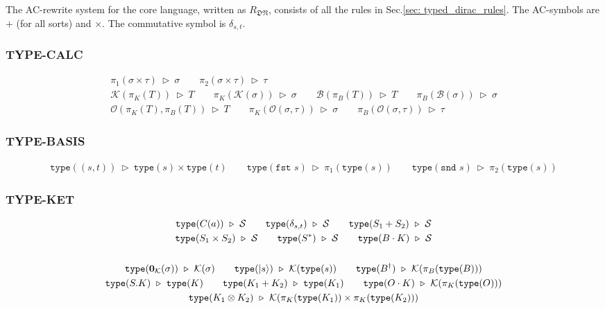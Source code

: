 \documentclass[manuscript, review, timestamp]{acmart}
\newcommand*{\Sc}{\mathcal{S}}
\newcommand*{\K}{\mathcal{K}}
\newcommand*{\B}{\mathcal{B}}
\newcommand*{\Op}{\mathcal{O}}
\newcommand*{\type}{\texttt{type}}
\newcommand*{\fst}{\texttt{fst }}
\newcommand*{\snd}{\texttt{snd }}
\newcommand*{\reduce}{\ \triangleright\ }
\begin{document}
\begin{definition} 
  The AC-rewrite system for the core language, written as $R_\mathfrak{DN}$, consists of all the rules in Sec.\ref{sec: typed_dirac_rules}.
  The AC-symbols are $+$ (for all sorts) and $\times$. The commutative symbol is $\delta_{s, t}$.
\end{definition}

\subsubsection*{\textsf{TYPE-CALC}}
\begin{gather*}
  \pi_1(\sigma \times \tau) \reduce \sigma 
  \qquad
  \pi_2(\sigma \times \tau) \reduce \tau 
  \\
  \K(\pi_K(T)) \reduce T
  \qquad 
  \pi_K(\K(\sigma)) \reduce \sigma
  \qquad
  \B(\pi_B(T)) \reduce T
  \qquad 
  \pi_B(\B(\sigma)) \reduce \sigma
  \\
  \Op(\pi_K(T), \pi_B(T)) \reduce T
  \qquad
  \pi_K(\Op(\sigma, \tau)) \reduce \sigma
  \qquad
  \pi_B(\Op(\sigma, \tau)) \reduce \tau
\end{gather*}

\subsubsection*{\textsf{TYPE-BASIS}}
\begin{gather*}
  \type((s, t)) \reduce \type(s) \times \type(t)
  \qquad
  \type(\fst s) \reduce \pi_1 (\type(s))
  \qquad
  \type(\snd s) \reduce \pi_2 (\type(s))
\end{gather*}

\subsubsection*{\textsf{TYPE-KET}}
\begin{gather*}
  \type(C(a)) \reduce \Sc
  \qquad
  \type(\delta_{s, t}) \reduce \Sc
  \qquad
  \type(S_1 + S_2) \reduce \Sc
  \\
  \type(S_1 \times S_2) \reduce \Sc
  \qquad
  \type(S^*) \reduce \Sc
  \qquad
  \type(B \cdot K) \reduce \Sc \\
  \\
  \type(\mathbf{0}_\mathcal{K}(\sigma)) \reduce \K(\sigma)
  \qquad
  \type(\ket{s}) \reduce \K(\type(s))
  \qquad
  \type(B^\dagger) \reduce \K(\pi_B(\type(B))) 
  \\
  \type(S . K) \reduce \type(K)
  \qquad
  \type(K_1 + K_2) \reduce \type(K_1)
  \qquad
  \type(O \cdot K) \reduce \K(\pi_K(\type(O)))
  \\
  \type(K_1 \otimes K_2) \reduce \K(\pi_K(\type(K_1)) \times \pi_K(\type(K_2)))
\end{gather*}
\end{document}
